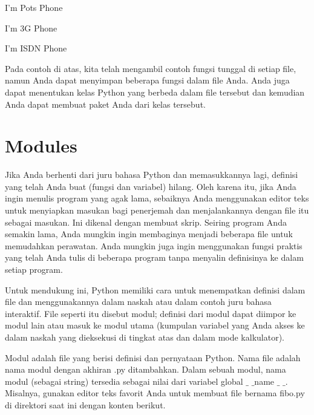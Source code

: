 \documentclass[a4paper,12pt]{report}
\begin{document}
 \par
\noindent 
 \hspace*{0.5in} I'm Pots Phone \par
\noindent 
 \hspace*{0.5in} I'm 3G Phone \par
\noindent 
 \hspace*{0.5in} I'm ISDN Phone \par
\noindent 
Pada contoh di atas, kita telah mengambil contoh fungsi tunggal di setiap file, namun Anda dapat menyimpan beberapa fungsi dalam file Anda. Anda juga dapat menentukan kelas Python yang berbeda dalam file tersebut dan kemudian Anda dapat membuat paket Anda dari kelas tersebut. \par
\vspace{12pt}
\noindent 
\section*{Modules}
 \par
\noindent 
Jika Anda berhenti dari juru bahasa Python dan memasukkannya lagi, definisi yang telah Anda buat (fungsi dan variabel) hilang. Oleh karena itu, jika Anda ingin menulis program yang agak lama, sebaiknya Anda menggunakan editor teks untuk menyiapkan masukan bagi penerjemah dan menjalankannya dengan file itu sebagai masukan. Ini dikenal dengan membuat skrip. Seiring program Anda semakin lama, Anda mungkin ingin membaginya menjadi beberapa file untuk memudahkan perawatan. Anda mungkin juga ingin menggunakan fungsi praktis yang telah Anda tulis di beberapa program tanpa menyalin definisinya ke dalam setiap program. \par
\noindent 
Untuk mendukung ini, Python memiliki cara untuk menempatkan definisi dalam file dan menggunakannya dalam naskah atau dalam contoh juru bahasa interaktif. File seperti itu disebut modul; definisi dari modul dapat diimpor ke modul lain atau masuk ke modul utama (kumpulan variabel yang Anda akses ke dalam naskah yang dieksekusi di tingkat atas dan dalam mode kalkulator). \par
\noindent 
Modul adalah file yang berisi definisi dan pernyataan Python. Nama file adalah nama modul dengan akhiran .py ditambahkan. Dalam sebuah modul, nama modul (sebagai string) tersedia sebagai nilai dari variabel global  $  \_  $ $  \_  $name $  \_  $ $  \_  $. Misalnya, gunakan editor teks favorit Anda untuk membuat file bernama fibo.py di direktori saat ini dengan konten berikut. \par
\vspace{12pt}
\noindent 
\end{document}
